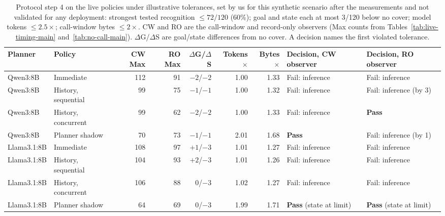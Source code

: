 \begin{table}[t]\centering\small
\caption{Protocol step 4 on the live policies under illustrative tolerances, set by us for this synthetic scenario after the measurements and not validated for any deployment: strongest tested recognition $\le 72/120$ (60\%); goal and state each at most 3/120 below no cover; model tokens $\le2.5\times$; call-window bytes $\le2\times$. CW and RO are the call-window and record-only observers (Max counts from Tables~\ref{tab:live-timing-main} and~\ref{tab:no-call-main}). $\Delta$G/$\Delta$S are goal/state differences from no cover. A decision names the first violated tolerance.}\label{tab:decision}
\setlength{\tabcolsep}{4pt}
\begin{tabularx}{\textwidth}{@{}llrrrrrYY@{}}\toprule
Planner & Policy & CW Max & RO Max & $\Delta$G/$\Delta$S & Tokens$\times$ & Bytes$\times$ & Decision, CW observer & Decision, RO observer \\\midrule
Qwen3:8B & Immediate & 112 & 91 & $-2$/$-2$ & 1.00 & 1.33 & Fail: inference & Fail: inference \\
Qwen3:8B & History, sequential & 99 & 75 & $-1$/$-1$ & 1.00 & 1.32 & Fail: inference & Fail: inference (by 3) \\
Qwen3:8B & History, concurrent & 99 & 62 & $-2$/$-2$ & 1.00 & 1.33 & Fail: inference & \textbf{Pass} \\
Qwen3:8B & Planner shadow & 70 & 73 & $-1$/$-1$ & 2.01 & 1.68 & \textbf{Pass} & Fail: inference (by 1) \\\midrule
Llama3.1:8B & Immediate & 108 & 97 & $+1$/$-3$ & 1.01 & 1.27 & Fail: inference & Fail: inference \\
Llama3.1:8B & History, sequential & 104 & 93 & $+2$/$-3$ & 1.01 & 1.26 & Fail: inference & Fail: inference \\
Llama3.1:8B & History, concurrent & 106 & 88 & $0$/$-3$ & 1.02 & 1.27 & Fail: inference & Fail: inference \\
Llama3.1:8B & Planner shadow & 64 & 69 & $0$/$-3$ & 1.99 & 1.71 & \textbf{Pass} (state at limit) & \textbf{Pass} (state at limit) \\\bottomrule
\end{tabularx}\end{table}
